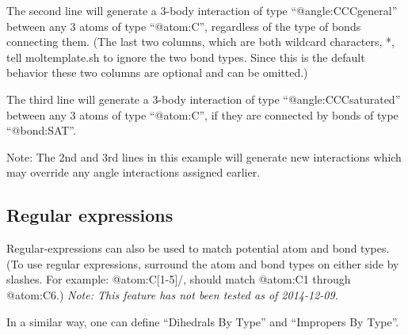 \documentclass[11pt]{article}
\begin{document}
The second line will generate a 3-body interaction 
of type \mbox{``@angle:CCCgeneral''}
between any 3 atoms of type \mbox{``@atom:C''},
regardless of the type of bonds connecting them.
(The last two columns, which are both wildcard characters, *, 
 tell moltemplate.sh to ignore the two bond types.
 Since this is the default behavior 
 these two columns are optional and can be omitted.)

The third line will generate a 3-body interaction of
type \mbox{``@angle:CCCsaturated''}
between any 3 atoms of type \mbox{``@atom:C''},
if they are connected by bonds of type \mbox{``@bond:SAT''}.

Note: The 2nd and 3rd lines in this example will generate new interactions 
which may override any angle interactions assigned earlier.

\subsection*{Regular expressions}
Regular-expressions can also be used to match potential atom and bond types.
(To use regular expressions, surround the atom and 
bond types on either side by slashes.  
For example: \mbox{@atom:C[1-5]/}, should match 
\mbox{@atom:C1} through \mbox{@atom:C6}.)
\textit{Note: This feature has not been tested as of 2014-12-09.}

In a similar way, one can define ``Dihedrals By Type'' and 
``Impropers By Type''.


\end{document}
